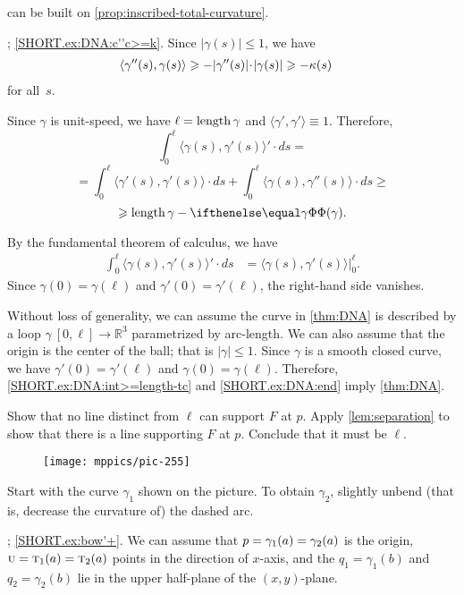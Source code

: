 \begin{multicols}{2}
 can be built on \ref{prop:inscribed-total-curvature}.

\parbf{\ref{ex:DNA}}; \ref{SHORT.ex:DNA:c''c>=k}.
Since $|\gamma(s)|\le 1$, we have
\begin{align*}
\langle\gamma''(s),\gamma(s)\rangle&\ge -|\gamma''(s)|\cdot|\gamma(s)|\ge-\kur(s)
\end{align*}
for all~$s$.

Since $\gamma$ is unit-speed, we have $\ell=\mathop{\rm length}\nolimits\gamma$ and $\langle\gamma',\gamma'\rangle\equiv1$.
Therefore,
\[\int_0^\ell\langle\gamma(s),\gamma'(s)\rangle'\cdot ds
=\]
\[=\int_0^\ell\langle\gamma'(s),\gamma'(s)\rangle\cdot ds+\int_0^\ell\langle\gamma(s),\gamma''(s)\rangle\cdot ds\ge\]
\[\ge \length\gamma-\tc\gamma.\]


By the fundamental theorem of calculus, we have
\begin{align*}
\int_0^\ell\langle\gamma(s),\gamma'(s)\rangle'\cdot ds
&=\langle\gamma(s),\gamma'(s)\rangle\bigg|_0^\ell.
\end{align*}
Since $\gamma(0)=\gamma(\ell)$ and $\gamma'(0)=\gamma'(\ell)$, the right-hand side vanishes.

Without loss of generality, we can assume the curve in \ref{thm:DNA} is described by a loop $\gamma\:[0,\ell]\to\mathbb{R}^3$ parametrized by arc-length.
We can also assume that the origin is the center of the ball; that is $|\gamma|\le 1$.
Since $\gamma$ is a smooth closed curve, we have 
$\gamma'(0)=\gamma'(\ell)$ and $\gamma(0)=\gamma(\ell)$.
Therefore, \ref{SHORT.ex:DNA:int>=length-tc} and \ref{SHORT.ex:DNA:end} imply \ref{thm:DNA}.

Show that no line distinct from $\ell$ can support $F$ at $p$. 
Apply \ref{lem:separation} to show that there is a line supporting $F$ at $p$.
Conclude that it must be $\ell$.

{

\begin{wrapfigure}{r}{22 mm}
\vskip-6mm
\centering
\texttt{[image: mppics/pic-255]}
\vskip0mm
\end{wrapfigure}

Start with the curve $\gamma_1$ shown on the picture.
To obtain $\gamma_2$, slightly unbend (that is, decrease the curvature of) the dashed arc.

}

\parbf{\ref{ex:bow'}}; \ref{SHORT.ex:bow'+}.
We can assume that $p=\gamma_1(a)\z=\gamma_2(a)$ is the origin, 
$\vec u=\tan_1(a)\z=\tan_2(a)$ points in the direction of $x$-axis,
and the $q_1=\gamma_1(b)$ and $q_2=\gamma_2(b)$ lie in the upper half-plane of the $(x,y)$-plane.


\end{multicols}
